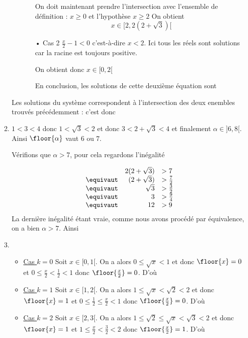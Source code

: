 \begin{correction}
\begin{enumerate}
\begin{itemize}
\begin{itemize}
On doit maintenant prendre l'intersection avec l'ensemble de définition : $x\geq 0$ et l'hypothèse $x\geq 2$ 
On obtient 
$$x\in [2,2(2+\sqrt{3})[$$



\item[•] Cas 2 $\frac{x}{2}-1< 0$ c'est-à-dire $x< 2$.   Ici tous les réels sont solutions car la racine est toujours positive. 

On obtient donc $x\in [0,2[$

En conclusion, les solutions de cette deuxième équation sont 
\conclusion{  $[0,2(2+\sqrt{3})[$}

\end{itemize}
\end{itemize}

Les solutions du système correspondent à l'intersection des deux enembles trouvés précédemment : c'est donc 
\conclusion{  $[0,2(2+\sqrt{3})[$}


\item $1<3< 4$ donc $1<\sqrt{3}<2$ et donc 
$3<2+\sqrt{3}<4$ et finalement $\alpha \in ]6, 8[$.
Ainsi $\floor{\alpha  }$ vaut $6$ ou $7$. 

Vérifions que $\alpha >7$, pour cela regardons l'inégalité 

$$\begin{array}{lrl}
&2(2+\sqrt{3})&>7\\
\equivaut &(2+\sqrt{3})&>\frac{7}{2}\\
\equivaut &\sqrt{3} &>\frac{3}{2}\\
\equivaut &3&>\frac{9}{4}\\
\equivaut & 12&>9
\end{array}$$
La dernière inégalité étant vraie, comme nous avons procédé par équivalence, on a bien $\alpha >7$. 
Ainsi 

\item \begin{itemize}
\item \underline{Cas $k=0$}
Soit $x\in [0,1[$. On a alors $0\leq \sqrt{x}<1$ et donc $\floor{x}=0$ et $0\leq \frac{x}{2}<\frac{1}{2}<1$ donc 
$\floor{\frac{x}{2}} =0$. D'où 
\conclusion{
$\forall x\in [0,1[\,\quad  \floor{\sqrt{x}} = \floor{ \frac{x}{2}}$
}
\item \underline{Cas $k=1$}
Soit $x\in [1,2[$. On a alors $1\leq \sqrt{x}<\sqrt{2}<2$ et donc $\floor{x}=1$ et $0\leq \frac{1}{2}\leq \frac{x}{2}<1$ donc 
$\floor{\frac{x}{2}} =0$. D'où 
\conclusion{
$\forall x\in [1,2[\,\quad  \floor{\sqrt{x}} \neq  \floor{ \frac{x}{2}}$
}
\item \underline{Cas $k=2$}
Soit $x\in [2,3[$. On a alors $1\leq \sqrt{2}\leq\sqrt{x}<\sqrt{3}<2$ et donc $\floor{x}=1$ et $1\leq \frac{x}{2}<\frac{3}{2}<2$ donc 
$\floor{\frac{x}{2}} =1$. D'où 
\conclusion{
$\forall x\in [2,3[\,\quad  \floor{\sqrt{x}} =  \floor{ \frac{x}{2}}$
}



\end{itemize}
\end{enumerate}
\end{correction}

